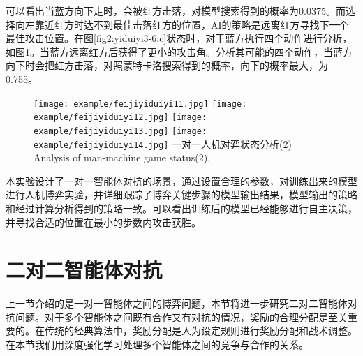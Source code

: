 可以看出当蓝方向下走时，会被红方击落，对模型搜索得到的概率为0.0375。而选择向左靠近红方时达不到最佳击落红方的位置，AI的策略是远离红方寻找下一个最佳攻击位置。在图\ref{fig2:yiduiyi3-6:c}状态时，对于蓝方执行四个动作进行分析，如图\ref{fig2:yiduiyi11-14}。当蓝方远离红方后获得了更小的攻击角。分析其可能的四个动作，当蓝方向下时会把红方击落，对照蒙特卡洛搜索得到的概率，向下的概率最大，为0.755。

\begin{figure}[htpb]
	\centering
	{\texttt{[image: example/feijiyiduiyi11.jpg]}}
	\hspace{0.5em}
	{\texttt{[image: example/feijiyiduiyi12.jpg]}}
	\newline
	\centering
	{\texttt{[image: example/feijiyiduiyi13.jpg]}}
	\hspace{0.5em}
	{\texttt{[image: example/feijiyiduiyi14.jpg]}}
	\bicaption
	{一对一人机对弈状态分析(2)}
	{Analysis of man-machine game status(2).}
	\label{fig2:yiduiyi11-14}
\end{figure}


本实验设计了一对一智能体对抗的场景，通过设置合理的参数，对训练出来的模型进行人机博弈实验，并详细跟踪了博弈关键步骤的模型输出结果，模型输出的策略和经过计算分析得到的策略一致。可以看出训练后的模型已经能够进行自主决策，并寻找合适的位置在最小的步数内攻击获胜。

\section{二对二智能体对抗}
上一节介绍的是一对一智能体之间的博弈问题，本节将进一步研究二对二智能体对抗问题。对于多个智能体之间既有合作又有对抗的情况，奖励的合理分配是至关重要的。在传统的经典算法中，奖励分配是人为设定规则进行奖励分配和战术调整。在本节我们用深度强化学习处理多个智能体之间的竞争与合作的关系。
